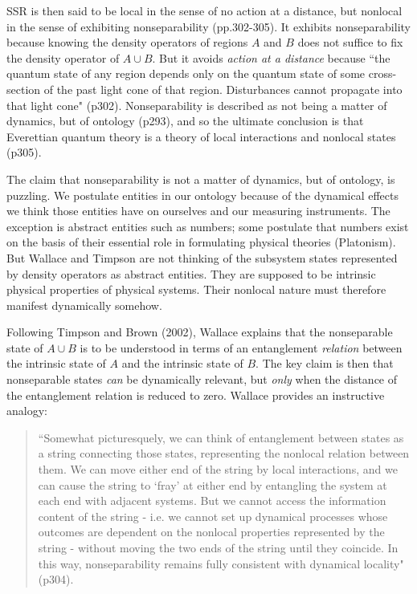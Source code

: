 \documentclass[12pt]{article}
\begin{document}
SSR is then said to be local in the sense of no action at a distance, but nonlocal in the sense of exhibiting nonseparability (pp.302-305). It exhibits nonseparability because knowing the density operators of regions $A$ and $B$ does not suffice to fix the density operator of $A\cup B$. But it avoids \textit{action at a distance} because ``the quantum state of any region depends only on the quantum state of some cross-section of the past light cone of that region. Disturbances cannot propagate into that light cone" (p302). Nonseparability is described as not being a matter of dynamics, but of ontology (p293), and so the ultimate conclusion is that Everettian quantum theory is a theory of local interactions and nonlocal states (p305).

The claim that nonseparability is not a matter of dynamics, but of ontology, is puzzling. We postulate entities in our ontology because of the dynamical effects we think those entities have on ourselves and our measuring instruments. The exception is abstract entities such as numbers; some postulate that numbers exist on the basis of their essential role in formulating physical theories (Platonism). But Wallace and Timpson are not thinking of the subsystem states represented by density operators as abstract entities. They are supposed to be intrinsic physical properties of physical systems. Their nonlocal nature must therefore manifest dynamically somehow.

Following Timpson and Brown (2002), Wallace explains that the nonseparable state of $A\cup B$ is to be understood in terms of an entanglement \textit{relation} between the intrinsic state of $A$ and the intrinsic state of $B$. The key claim is then that nonseparable states \textit{can} be dynamically relevant, but \textit{only} when the distance of the entanglement relation is reduced to zero. Wallace provides an instructive analogy:

\begin{quote}
    ``Somewhat picturesquely, we can think of entanglement between states as a string connecting those states, representing the nonlocal relation between them. We can move either end of the string by local interactions, and we can cause the string to `fray' at either end by entangling the system at each end with adjacent systems. But we cannot access the information content of the string - i.e. we cannot set up dynamical processes whose outcomes are dependent on the nonlocal properties represented by the string - without moving the two ends of the string until they coincide. In this way, nonseparability remains fully consistent with dynamical locality" (p304).
    \end{quote}
\end{document}

